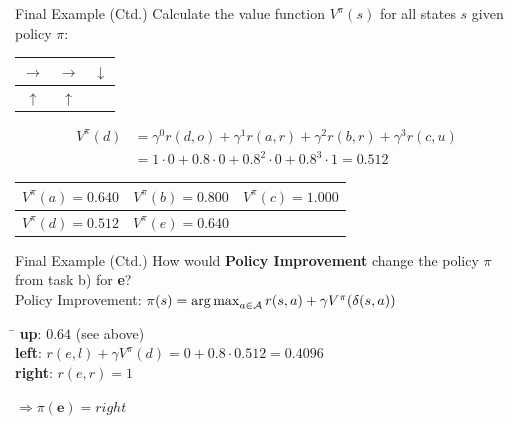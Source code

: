 \begin{frame}{Final Example (Ctd.)}{}
	 Calculate the value function $V^{\pi}(s)$ for all states $s$ given policy $\pi$:

	\begin{table}
		\centering
		\begin{tabular}{| c | c | c |}
			\hline
			$\rightarrow$ 	& 	$\rightarrow$ 	& 	$\downarrow$ 	\\ \hline
			$\uparrow$ 	& 	$\uparrow$ 	& 				\\ \hline
		\end{tabular}
	\end{table}

	\vspace*{-3mm}
	\begin{align*}
		V^{\pi}(d) 	&= \gamma^0 r(d, o) + \gamma^1 r(a, r) + \gamma^2 r(b, r) + \gamma^3 r(c,u) \\
					&= 1 \cdot 0 + 0.8 \cdot 0 + 0.8^2 \cdot 0 + 0.8^3 \cdot 1 = \bm{0.512}
	\end{align*}

	\begin{table}
		\centering
		\begin{tabular}{| c | c | c |}
			\hline
			$V^{\pi}(a) = 0.640$		& 	$V^{\pi}(b) = 0.800$ 	&	$V^{\pi}(c) = 1.000$ 	\\ \hline
			$V^{\pi}(d) = 0.512$		&	$V^{\pi}(e) = 0.640$		&				\\ \hline
		\end{tabular}
	\end{table}
\end{frame}


\begin{frame}{Final Example (Ctd.)}{}
	 How would \textbf{Policy Improvement} change the policy $\pi$ from task b) for \textbf{e}? \\[5mm]

	Policy Improvement: $\pi(s) = \operatorname*{arg\,max}_{a \in \mathcal{A}} r(s, a) + \gamma V^{\pi}(\delta(s, a))$
	
	\begin{tabbing}
		\hspace*{1.5cm}\= \kill
		\textbf{up}:		\>	$0.64$ (see above) \\
		\textbf{left}: 		\>	$r(e, l) + \gamma V^{\pi}(d) = 0 + 0.8 \cdot 0.512 = 0.4096$ \\
		\textbf{right}: 		\>	$r(e, r) = 1$ 	
	\end{tabbing}

	$\Rightarrow \pi(\bm{e}) = right$
\end{frame}


